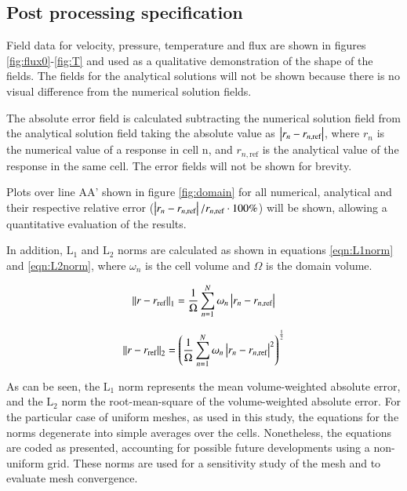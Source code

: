 
\subsection{Post processing specification}

Field data for velocity, pressure, temperature and flux are shown in figures \ref{fig:flux0}-\ref{fig:T} and used as a qualitative demonstration of the shape of the fields.
The fields for the analytical solutions will not be shown because there is no visual difference from the numerical solution fields.

The absolute error field is calculated subtracting the numerical solution field from the analytical solution field taking the absolute value as $ \left\lvert r_{n} - r_{ n,\text{ref} } \right\rvert $, where $ r_{n} $ is the numerical value of a response in cell n, and $ r_{ n,\text{ref} } $ is the analytical value of the response in the same cell.
The error fields will not be shown for brevity.

Plots over line AA' shown in figure \ref{fig:domain} for all numerical, analytical and their respective relative error ($ \left\lvert r_{n} - r_{ n,\text{ref} } \right\rvert/r_{ n,\text{ref} } \cdot 100\% $) will be shown, allowing a quantitative evaluation of the results.

In addition, $ \text{L}_{1} $ and $ \text{L}_{2} $ norms are calculated as shown in equations \ref{eqn:L1norm} and \ref{eqn:L2norm}, where $ \omega_{n} $ is the cell volume and $ \Omega $ is the domain volume.

\begin{equation}
    \LOneNorm
\end{equation}

\begin{equation}
    \LTwoNorm
\end{equation}

As can be seen, the $ \text{L}_{1} $ norm represents the mean volume-weighted absolute error, and the $ \text{L}_{2} $ norm the root-mean-square of the volume-weighted absolute error.
For the particular case of uniform meshes, as used in this study, the equations for the norms degenerate into simple averages over the cells.
Nonetheless, the equations are coded as presented, accounting for possible future developments using a non-uniform grid.
These norms are used for a sensitivity study of the mesh and to evaluate mesh convergence.
